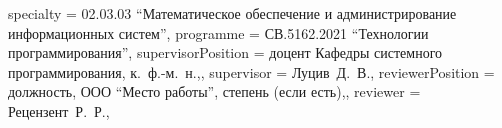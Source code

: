 {    specialty          = {02.03.03 \enquote{Математическое обеспечение и администрирование информационных систем}},
    programme          = {СВ.5162.2021 \enquote{Технологии программирования}},
    supervisorPosition = {доцент Кафедры системного программирования, к.~ф.-м.~н.,},
    supervisor         = {Луцив~Д.~В.},
    reviewerPosition   = {должность, ООО \enquote{Место работы}, степень (если есть),},
    reviewer           = {Рецензент~Р.~Р.},
}
